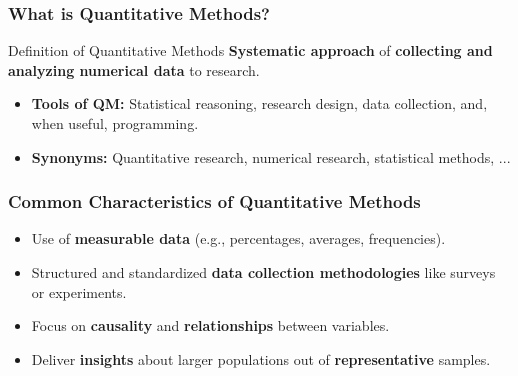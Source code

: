 \documentclass[aspectratio=169]{beamer}
\begin{document}
\begin{frame}
    \frametitle{What is Quantitative Methods?}
    
    \begin{coolblock}{Definition of Quantitative Methods}
    \textbf{Systematic approach} of \textbf{collecting and analyzing numerical data} to research.
    \end{coolblock}
    \vspace{0.8cm}

    \begin{itemize}
        \item \textbf{Tools of QM:} Statistical reasoning, research design, data collection, and, when useful, programming.
        \vspace{0.3cm}

        \item \textbf{Synonyms:} Quantitative research, numerical research, statistical methods, ... 
    \end{itemize}
    \vspace{0.5cm}
    
\end{frame}

\begin{frame}
    \frametitle{Common Characteristics of Quantitative Methods}
    \begin{itemize}
        \item Use of \textbf{measurable data} (e.g., percentages, averages, frequencies). \medskip
        \item Structured and standardized \textbf{data collection methodologies} like surveys or experiments. \medskip
        \item Focus on \textbf{causality} and \textbf{relationships} between variables. \medskip
        \item Deliver \textbf{insights} about larger populations out of \textbf{representative} samples.
    \end{itemize}
\end{frame}
\end{document}
